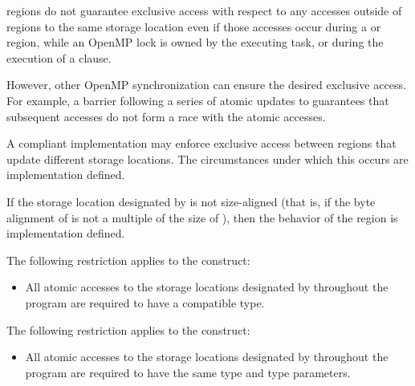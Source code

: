  regions do not guarantee exclusive access with respect to any accesses outside 
of  regions to the same storage location  even if those accesses occur during a 
 or  region, while an OpenMP lock is owned by the executing 
task, or during the execution of a  clause.

However, other OpenMP synchronization can ensure the desired exclusive access. For 
example, a barrier following a series of atomic updates to  guarantees that subsequent 
accesses do not form a race with the atomic accesses. 

A compliant implementation may enforce exclusive access between  regions 
that update different storage locations. The circumstances under which this occurs are 
implementation defined. 

If the storage location designated by  is not size-aligned (that is, if the byte alignment 
of  is not a multiple of the size of ), then the behavior of the  region is 
implementation defined.

\begin{samepage}
\restrictions
\ccppspecificstart
The following restriction applies to the  construct:

\begin{itemize}
\item All atomic accesses to the storage locations designated by  throughout the program 
are required to have a compatible type. 
\end{itemize}
\ccppspecificend
\end{samepage}

\fortranspecificstart
The following restriction applies to the  construct:

\begin{itemize}
\item All atomic accesses to the storage locations designated by  throughout the program 
are required to have the same type and type parameters. 
\end{itemize}
\fortranspecificend

